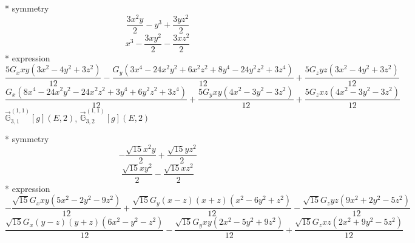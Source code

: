 \documentclass[fleqn,8pt]{jsarticle}
\begin{document}
\noindent\quad ** symmetry
\begin{dmath*}
\frac{3 x^{2} y}{2} - y^{3} + \frac{3 y z^{2}}{2}
\end{dmath*}
\begin{dmath*}
x^{3} - \frac{3 x y^{2}}{2} - \frac{3 x z^{2}}{2}
\end{dmath*}
\noindent\quad ** expression
\begin{dmath*}
\frac{5 G_{x} x y \left(3 x^{2} - 4 y^{2} + 3 z^{2}\right)}{12} - \frac{G_{y} \left(3 x^{4} - 24 x^{2} y^{2} + 6 x^{2} z^{2} + 8 y^{4} - 24 y^{2} z^{2} + 3 z^{4}\right)}{12} + \frac{5 G_{z} y z \left(3 x^{2} - 4 y^{2} + 3 z^{2}\right)}{12}
\end{dmath*}
\begin{dmath*}
\frac{G_{x} \left(8 x^{4} - 24 x^{2} y^{2} - 24 x^{2} z^{2} + 3 y^{4} + 6 y^{2} z^{2} + 3 z^{4}\right)}{12} + \frac{5 G_{y} x y \left(4 x^{2} - 3 y^{2} - 3 z^{2}\right)}{12} + \frac{5 G_{z} x z \left(4 x^{2} - 3 y^{2} - 3 z^{2}\right)}{12}
\end{dmath*}
\noindent\quad $\vec{\mathbb{G}}_{3,1}^{(1,1)}[g](E,2)$, $\vec{\mathbb{G}}_{3,2}^{(1,1)}[g](E,2)$

\noindent\quad ** symmetry
\begin{dmath*}
- \frac{\sqrt{15} x^{2} y}{2} + \frac{\sqrt{15} y z^{2}}{2}
\end{dmath*}
\begin{dmath*}
\frac{\sqrt{15} x y^{2}}{2} - \frac{\sqrt{15} x z^{2}}{2}
\end{dmath*}
\noindent\quad ** expression
\begin{dmath*}
- \frac{\sqrt{15} G_{x} x y \left(5 x^{2} - 2 y^{2} - 9 z^{2}\right)}{12} + \frac{\sqrt{15} G_{y} \left(x - z\right) \left(x + z\right) \left(x^{2} - 6 y^{2} + z^{2}\right)}{12} - \frac{\sqrt{15} G_{z} y z \left(9 x^{2} + 2 y^{2} - 5 z^{2}\right)}{12}
\end{dmath*}
\begin{dmath*}
\frac{\sqrt{15} G_{x} \left(y - z\right) \left(y + z\right) \left(6 x^{2} - y^{2} - z^{2}\right)}{12} - \frac{\sqrt{15} G_{y} x y \left(2 x^{2} - 5 y^{2} + 9 z^{2}\right)}{12} + \frac{\sqrt{15} G_{z} x z \left(2 x^{2} + 9 y^{2} - 5 z^{2}\right)}{12}
\end{dmath*}
\end{document}
